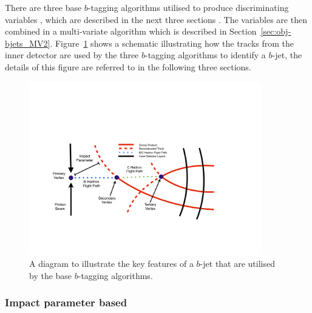    There are three base $b$-tagging algorithms utilised to produce discriminating variables \cite{obj-bjets_algo_2016}, which are described in the next three sections .
   The variables are then combined in a multi-variate algorithm which is described in Section~\ref{sec:obj-bjets_MV2}.
   Figure~\ref{fig:obj_bjet_schem} shows a schematic illustrating how the tracks from the inner detector
   are used by the three $b$-tagging algorithms to identify a $b$-jet, the details of this figure are referred to in the following three sections.
   
   \begin{figure}[!htb]
     \begin{center}
       \includegraphics[width=0.9\textwidth]{figs/Objects/bjet_schem.pdf}
       \caption{A diagram to illustrate the key features of a $b$-jet that are utilised by the base $b$-tagging algorithms.}
       \label{fig:obj_bjet_schem}
     \end{center}
     \vspace{-0.5cm}
   \end{figure}

   \subsubsection{Impact parameter based}
   \label{sec:obj-bjets_IP}
 
